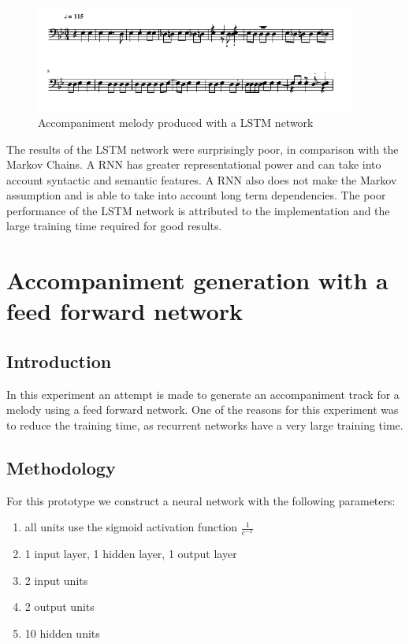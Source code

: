 \begin{figure}
\centerline{\includegraphics[width=400px]{../images/lstm_accomp.pdf}}
\caption{Accompaniment melody produced with a \ac{LSTM} network}
\label{ims:lstmaccomp}
\end{figure}

The results of the \ac{LSTM} network were surprisingly poor, in comparison with the Markov Chains. A \ac{RNN} has greater representational power and can take into account syntactic and semantic features. A \ac{RNN} also does not make the Markov assumption and is able to take into account long term dependencies. The poor performance of the \ac{LSTM} network is attributed to the implementation and the large training time required for good results.

\chapter{Accompaniment generation with a feed forward network}
\section{Introduction}
In this experiment an attempt is made to generate an accompaniment track for a melody using a feed forward network. One of the reasons for this experiment was to reduce the training time, as recurrent networks have a very large training time.

\section{Methodology}
For this prototype we construct a neural network with the following parameters:
\begin{enumerate}
\item all units use the sigmoid activation function $\frac{1}{e^{-x}}$
\item 1 input layer, 1 hidden layer, 1 output layer
\item 2 input units
\item 2 output units
\item 10 hidden units
\end{enumerate}

